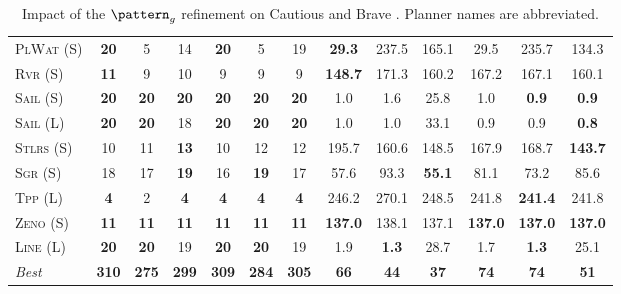 \documentclass[11pt,landscape]{article}
\begin{document}
\begin{table}[tb]
{\begin{tabular}{|l||cccccc||cccccc||}
\textsc{PlWat} (S)&\textbf{20}&5&14&\textbf{20}&5&19&\textbf{29.3}&237.5&165.1&29.5&235.7&134.3\\
\textsc{Rvr} (S)&\textbf{11}&9&10&9&9&9&\textbf{148.7}&171.3&160.2&167.2&167.1&160.1\\
\textsc{Sail} (S)&\textbf{20}&\textbf{20}&\textbf{20}&\textbf{20}&\textbf{20}&\textbf{20}&1.0&1.6&25.8&1.0&\textbf{0.9}&\textbf{0.9}\\
\textsc{Sail} (L)&\textbf{20}&\textbf{20}&18&\textbf{20}&\textbf{20}&\textbf{20}&1.0&1.0&33.1&0.9&0.9&\textbf{0.8}\\
\textsc{Stlrs} (S)&10&11&\textbf{13}&10&12&12&195.7&160.6&148.5&167.9&168.7&\textbf{143.7}\\
\textsc{Sgr} (S)&18&17&\textbf{19}&16&\textbf{19}&17&57.6&93.3&\textbf{55.1}&81.1&73.2&85.6\\
\textsc{Tpp} (L)&\textbf{4}&2&\textbf{4}&\textbf{4}&\textbf{4}&\textbf{4}&246.2&270.1&248.5&241.8&\textbf{241.4}&241.8\\
\textsc{Zeno} (S)&\textbf{11}&\textbf{11}&\textbf{11}&\textbf{11}&\textbf{11}&\textbf{11}&\textbf{137.0}&138.1&137.1&\textbf{137.0}&\textbf{137.0}&\textbf{137.0}\\
\textsc{Line} (L)&\textbf{20}&\textbf{20}&19&\textbf{20}&\textbf{20}&19&1.9&\textbf{1.3}&28.7&1.7&\textbf{1.3}&25.1
\\\hline
\textit{Best}&\textbf{310}&\textbf{275}&\textbf{299}&\textbf{309}&\textbf{284}&\textbf{305}&\textbf{66}&\textbf{44}&\textbf{37}&\textbf{74}&\textbf{74}&\textbf{51}\\\hline

        \end{tabular}}
        \caption{Impact of the $\pattern_g$ refinement on Cautious and Brave \pattyd. Planner names are abbreviated.}
        \label{tab:abl-patterng}
        \end{table}
        
\end{document}
